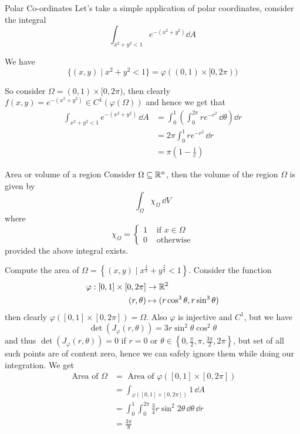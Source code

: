 \documentclass[../Analysis-3.tex]{subfiles}
\begin{document}
\begin{Eg}{Polar Co-ordinates}{}
  Let's take a simple application of polar coordinates, consider the integral
  \[
    \int_{x^2 + y^2 < 1} e^{-(x^2+y^2)} \dd A
  \]

  We have
  \[
    \{ (x,y) \mid x^2 + y^2 < 1 \} = \varphi( (0,1) \times [0,2\pi))
  \]

  So consider $\Omega = (0,1) \times [0,2\pi)$, then clearly $f(x,y) = e^{-(x^2+y^2)} \in C^1(\varphi(\Omega))$ and hence we get that
  \begin{align*}
    \int_{x^2+y^2 < 1} e^{-(x^2+y^2)} \, \dd A
     & = \int_0^1 \left( \int_0^{2\pi} re^{-r^2} \, \dd \theta \right) \dd r \\
     & = 2\pi \int_0^1 r e^{-r^2} \, \dd r                                   \\
     & = \pi \left( 1 - \frac{1}{e}\right)
  \end{align*}
\end{Eg}

\begin{Def}{Area or volume of a region}{}
  Consider $\Omega \subseteq \mathbb{R}^n$, then the volume of the region $\Omega$ is given by
  \[
    \int_{\Omega} \chi_{\Omega} \, \dd V
  \]
  where
  \[
    \chi_{\Omega} = \begin{cases}
      1 & \mbox{ if } x \in \Omega \\
      0 & \mbox{ otherwise}
    \end{cases}
  \]
  provided the above integral exists.
\end{Def}

\begin{Eg}{}{}
  Compute the area of $\Omega = \left\{ (x,y) \mid x^{\frac{2}{3}} + y^{\frac{2}{3}} < 1 \right\}$. Consider the function
  \begin{align*}
    \varphi : [0,1] \times [0,2\pi] & \to \mathbb{R}^2                                 \\
    (r,\theta)                      & \mapsto ( r\cos^3\theta, r\sin^3\theta )
  \end{align*}
  then clearly $\varphi([0,1] \times [0,2\pi]) = \Omega$. Also $\varphi$ is injective and $C^1$, but we have
  \[
    \det(J_{\varphi}(r,\theta)) = 3r \sin^2\theta \cos^2\theta
  \]
  and thus $\det(J_{\varphi}(r,\theta)) = 0$ if $r = 0$ or $\theta \in \left\{ 0, \frac{\pi}{2}, \pi, \frac{3\pi}{2}, 2\pi \right\}$, but set of all such points are of content zero, hence we can safely ignore them while doing our integration. We get
  \begin{align*}
    \mbox{ Area of } \Omega
     & = \mbox{ Area of } \varphi \left( [0,1] \times [0,2\pi] \right)              \\
     & = \int_{\varphi([0,1] \times [0,2\pi])} 1 \, \dd A                           \\
     & = \int_0^1 \int_0^{2\pi} \frac{3}{4} r \sin^2 2\theta \, \dd \theta \, \dd r \\
     & = \frac{3\pi}{8}
  \end{align*}
\end{Eg}
\end{document}
